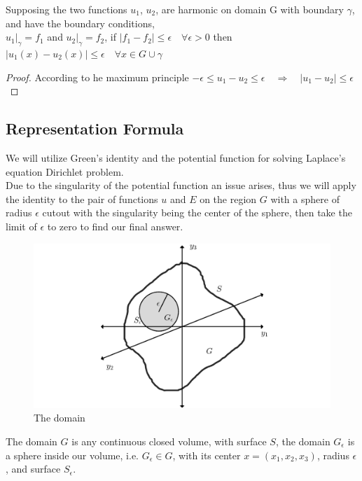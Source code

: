 \documentclass[]{article}
\begin{document}
\begin{theorem}
    Supposing the two functions $u_1$, $u_2$, are harmonic on domain G with boundary $\gamma$, and have the boundary conditions, 
    \\
    $u_1|_\gamma = f_1$ and $u_2|_\gamma = f_2$, if $|f_1 - f_2| \leq \epsilon  \quad \forall \epsilon > 0$ then $|u_1(x) - u_2(x)| \leq \epsilon \quad \forall x \in G \cup \gamma $
\end{theorem}
\begin{proof}
    According to he maximum principle $-\epsilon \leq u_1 - u_2 \leq \epsilon \quad \Rightarrow \quad |u_1 - u_2| \leq \epsilon$
\end{proof}
\newpage
\setcounter{equation}{0}
\subsection{Representation Formula}
We will utilize Green's identity and the potential function for solving Laplace's equation Dirichlet problem. 
\\
Due to the singularity of the potential function an issue arises, 
thus we will apply the identity to the pair of functions $u$ and $E$ on the region $G$ 
with a sphere of radius $\epsilon$ cutout with the singularity being the center of the sphere, 
then take the limit of $\epsilon$ to zero to find our final answer.
\begin{figure}[h]
\begin{center}
\includegraphics[scale=0.15]{rep.png}
\captionlabelfalse
\caption{The domain}
\end{center}
\end{figure}
\par
The domain $G$ is any continuous closed volume, with surface $S$, the domain $G_\epsilon$ is a sphere inside our volume, i.e. $G_\epsilon \in G$, with its center $x = (x_1,x_2,x_3)$, radius $\epsilon$, and surface $S_\epsilon$. 
\end{document}
